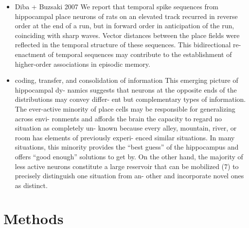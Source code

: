 \documentclass{article} %
\begin{document}
\begin{itemize}
\begin{itemize}
\item
Diba + Buzsaki 2007
We report that temporal spike sequences from hippocampal place neurons of rats on an elevated track recurred in reverse order at the end of a run, but in forward order in anticipation of the run, coinciding with sharp waves. Vector distances between the place fields were reflected in the temporal structure of these sequences. This bidirectional re-enactment of temporal sequences may contribute to the establishment of higher-order associations in episodic memory.

\item
coding, transfer, and consolidation of
information
This emerging picture of hippocampal dy- namics suggests that neurons at the opposite ends of the distributions may convey differ- ent but complementary types of information. The ever-active minority of place cells may be responsible for generalizing across envi- ronments and affords the brain the capacity to regard no situation as completely un- known because every alley, mountain, river, or room has elements of previously experi- enced similar situations. In many situations,
this minority provides the “best guess” of the hippocampus and offers “good enough” solutions to get by. On the other hand, the majority of less active neurons constitute a large reservoir that can be mobilized (7) to precisely distinguish one situation from an- other and incorporate novel ones as distinct.


\end{itemize}
\end{itemize}


\section{Methods}
\end{document}
